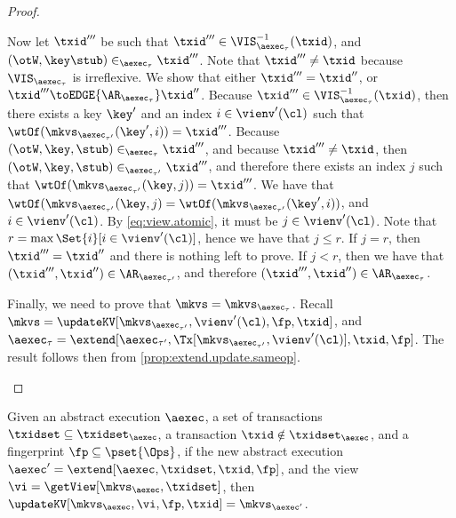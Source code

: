 \begin{proof}
\begin{itemize}
\begin{itemize}
Now let $\txid'''$ be such that $\txid''' \in \VIS^{-1}_{\aexec_{\tau}}(\txid)$, and $(\otW, \key \stub) \in_{\aexec_{\tau}} \txid'''$. 
Note that $\txid''' \neq \txid$ because $\VIS_{\aexec_{\tau}}$ is irreflexive.
We show that either $\txid''' = \txid''$, or $\txid''' \toEDGE{\AR_{\aexec_{\tau}}} \txid''$. 
Because $\txid''' \in \VIS^{-1}_{\aexec_{\tau}}(\txid)$, then there exists a key $\key'$ and an index $i \in \vienv'(\cl)$ 
such that $\wtOf(\mkvs_{\aexec_{\tau'}}(\key', i)) = \txid'''$. Because $(\otW, \key, \stub) \in_{\aexec_{\tau}} \txid'''$, 
and because $\txid''' \neq \txid$, then $(\otW, \key, \stub) \in_{\aexec_{\tau'}} \txid'''$, and therefore there exists 
an index $j$ such that $\wtOf(\mkvs_{\aexec_{\tau'}}(\key, j)) = \txid'''$. We have that $\wtOf(\mkvs_{\aexec_{\tau'}}(\key, j) = 
\wtOf(\mkvs_{\aexec_{\tau'}}(\key', i))$, and $i \in \vienv'(\cl)$. By \cref{eq:view.atomic}, it must be $j \in \vienv'(\cl)$. 
Note that $r = \max\Set{i}[ i \in \vienv'(\cl)]$, hence we have that $j \leq r$. If $j = r$, then $\txid''' = \txid''$ and 
there is nothing left to prove. If $j < r$, then we have that $(\txid''', \txid'') \in \AR_{\aexec_{\tau'}}$, and 
therefore $(\txid''', \txid'') \in \AR_{\aexec_{\tau}}$.
\end{itemize}
Finally, we need to prove that $\mkvs = \mkvs_{\aexec_{\tau}}$.
Recall $\mkvs = \updateKV[\mkvs_{\aexec_{\tau'}}, \vienv'(\cl), \fp, \txid]$, 
and $\aexec_{\tau} = \extend[\aexec_{\tau'}, \Tx[\mkvs_{\aexec_{\tau'}}, \vienv'(\cl)], \txid, \fp]$. 
The result follows then from \cref{prop:extend.update.sameop}. 
\end{itemize}
\end{proof}


\begin{proposition}
\label{prop:extend.update.sameop}
Given an abstract execution $\aexec$, a set of transactions $\txidset \subseteq \txidset_{\aexec}$,
a transaction $\txid \notin \txidset_{\aexec}$, and a fingerprint $\fp \subseteq \pset{\Ops}$,
if the new abstract execution $\aexec' = \extend[\aexec, \txidset, \txid, \fp]$,
and the view $\vi = \getView[\mkvs_{\aexec}, \txidset]$,
then $\updateKV[\mkvs_{\aexec}, \vi, \fp, \txid] = \mkvs_{\aexec'}$.
\end{proposition}

